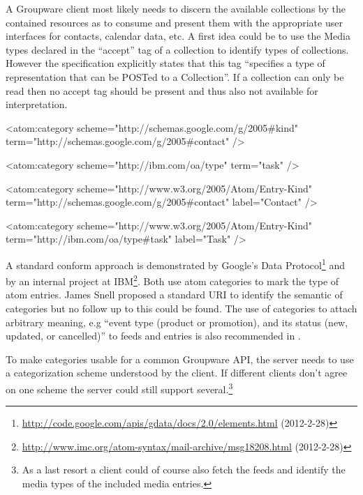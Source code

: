 \documentclass[12pt,a4paper]{scrartcl}		%
\newcommand{\citeurl}[2]{\url{#1} (#2)}
\begin{document}
A Groupware client most likely needs to discern the available collections by the
contained resources as to consume and present them with the appropriate user
interfaces for contacts, calendar data, etc. A first idea could be to use the
Media types declared in the ``accept'' tag of a collection to identify types of
collections. However the specification explicitly states that this tag
``specifies a type of representation that can be POSTed to a Collection''. If a
collection can only be read then no accept tag should be present and thus also
not available for interpretation.

\begin{anylisting}[label=fig:atom-category,
                   caption={ATOM categories as used by Google and IBM to mark entry
                            types and a proposal to use a standard scheme URI for type terms}]
<atom:category scheme="http://schemas.google.com/g/2005#kind"
               term="http://schemas.google.com/g/2005#contact" />

<atom:category scheme="http://ibm.com/oa/type"
               term="task" />

<atom:category scheme="http://www.w3.org/2005/Atom/Entry-Kind"
               term="http://schemas.google.com/g/2005#contact"
               label="Contact" />

<atom:category scheme="http://www.w3.org/2005/Atom/Entry-Kind"
               term="http://ibm.com/oa/type#task"
               label="Task" />
\end{anylisting}

A standard conform approach is demonstrated by Google's Data
Protocol\footnote{\citeurl{http://code.google.com/apis/gdata/docs/2.0/elements.html}{2012-2-28}}
and by an internal project at
IBM\footnote{\label{snellatomcategory}\citeurl{http://www.imc.org/atom-syntax/mail-archive/msg18208.html}{2012-2-28}}. Both
use atom categories\cite[sec. 8.3.6]{RFC5023} to mark the type of atom
entries. James Snell proposed a standard URI to identify the semantic of
categories but no follow up to this could be
found. The use of categories to attach arbitrary meaning, e.g ``event type
(product or promotion), and its status (new, updated, or cancelled)'' to feeds
and entries is also recommended in \cite[p. 200]{Webber2010}.

To make categories usable for a common Groupware API, the server needs to use a
categorization scheme understood by the client. If different clients don't agree
on one scheme the server could still support several.\footnote{As a last resort
  a client could of course also fetch the feeds and identify the media types of
  the included media entries.}
\end{document}
